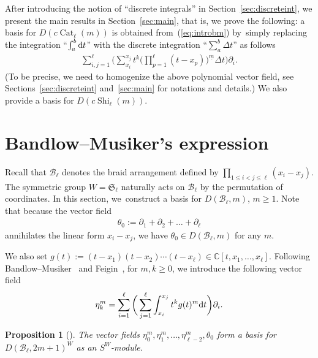 \documentclass[pdftex]{sigma}
\numberwithin{equation}{section}
\newtheorem{Proposition}[Theorem]{Proposition}
{ \theoremstyle{definition}
\newtheorem{Definition}[Theorem]{Definition}
\newtheorem{Example}[Theorem]{Example}
\newtheorem{Remark}[Theorem]{Remark} }
\newcommand{\B}{\mathcal{B}}
\newcommand{\C}{\mathbb{C}}
\newcommand{\Cat}{\operatorname{Cat}}
\newcommand{\Shi}{\operatorname{Shi}}
\newcommand{\sint}{\sum\nolimits}
\begin{document}
After introducing the notion of ``discrete integrals'' in Section~\ref{sec:discreteint},
we present the main results in Section~\ref{sec:main}, that is, we prove the
following: a basis for $D(c\Cat_\ell(m))$ is obtained from~(\ref{eq:introbm}) by~simply replacing the integration ``$\int_a^b {\rm d}t$''
with the discrete integration ``$\sint_a^b\Delta t$'' as follows
\begin{gather*}
\sum_{i, j=1}^\ell
\bigg(\sint_{x_i}^{x_j}t^k\bigg(\prod_{p=1}^\ell(t-x_p)\bigg)^{\underline{m}} \Delta t\bigg)\partial_i.
\end{gather*}
(To be precise, we need to homogenize the above polynomial vector field,
see Sections~\ref{sec:discreteint} and~\ref{sec:main} for notations and details.)
We also provide a basis for $D(c\Shi_\ell(m))$.

\section{Bandlow--Musiker's expression}\label{sec:bm}

Recall that $\B_\ell$ denotes the braid arrangement defined by
$\prod_{1\leq i<j\leq\ell}(x_i-x_j)$. The symmetric group
$W=\mathfrak{S}_\ell$ naturally acts on $\B_\ell$ by the permutation of
coordinates.
In this section, we~construct a basis for $D(\B_\ell, m)$, $m\geq 1$.
Note that because the vector field
\begin{gather*}
\theta_0:=\partial_1+\partial_2+\dots+\partial_\ell
\end{gather*}
annihilates the linear form $x_i-x_j$, we have $\theta_0\in D(\B_\ell, m)$
for any $m$.


We also set
$g(t):=(t-x_1)(t-x_2)\cdots(t-x_\ell)\in \C[t, x_1, \dots, x_\ell]$.
Following Bandlow--Musiker~\cite{bm} and Feigin~\cite{feigin},
for $m, k\geq 0$, we introduce the following vector field
\begin{gather}
\label{eq:eta}
\eta_k^m=\sum_{i=1}^\ell\bigg(\sum_{j=1}^\ell\int_{x_i}^{x_j}t^kg(t)^m {\rm d}t\bigg)\partial_i.
\end{gather}
\begin{Proposition}[\cite{bm, feigin}]\label{prop:bm}
The vector fields
$\eta_0^m, \eta_1^m, \dots, \eta_{\ell-2}^m, \theta_0$ form a
basis for $D(\B_\ell, 2m+1)^W$ as an $S^W$-module.
\end{Proposition}
\end{document}

